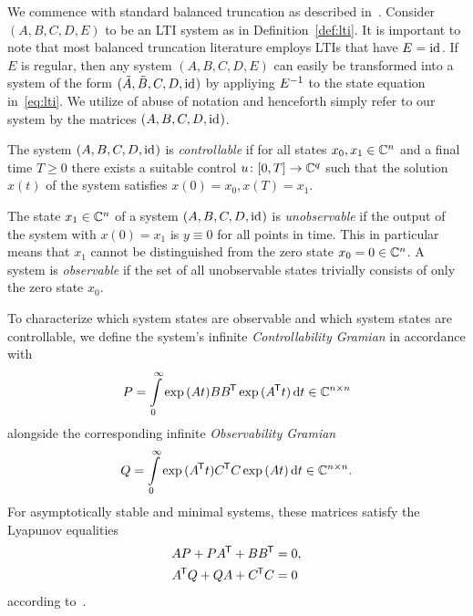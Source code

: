 We commence with standard balanced truncation as described in~\cite{BB2017}.
Consider $(A, B, C, D, E)$ to be an LTI system as in Definition~\ref{def:lti}.
It is important to note that most balanced truncation literature employs LTIs that have $E = \text{id}_{}$.
If $E$ is regular, then any system $(A, B, C, D, E)$ can easily be transformed into a system of the form $(\tilde{A}, \tilde{B}, C, D, \text{id}_{})$ by appliying $E^{-1}$ to the state equation in~\eqref{eq:lti}.
We utilize of abuse of notation and henceforth simply refer to our system by the matrices $(A, B, C, D, \text{id}_{})$.

\begin{definition}[{Cf.~\cite[Definition~6.2]{BB2017}}]\label{def:controllability}
    The system $(A, B, C, D, \text{id}_{})$ is \emph{controllable} if for all states $x_0, x_1 \in \mathbb{C}^n$ and a final time $T \geq 0$ there exists a suitable control $u \colon \interval{0}{T} \to \bb{C}^q$ such that the solution $x(t)$ of the system satisfies $x(0) = x_0, x(T) = x_1$.
\end{definition}

\begin{definition}[{Cf.~\cite[Definition~6.3]{BB2017}}]\label{def:observability}
    The state $x_1 \in \mathbb{C}^n$ of a system $(A, B, C, D, \text{id}_{})$ is \emph{unobservable} if the output of the system with $x(0) = x_1$ is $y \equiv 0$ for all points in time.
    This in particular means that $x_1$ cannot be distinguished from the zero state $x_0 = 0 \in \mathbb{C}^n$.
    A system is \emph{observable} if the set of all unobservable states trivially consists of only the zero state $x_0$.
\end{definition}

To characterize which system states are observable and which system states are controllable, we define the system's infinite \emph{Controllability Gramian} in accordance with~\cite[Equation~6.8]{BB2017}
\begin{equation}\label{eq:controllability-gramian}
    P = \int\limits_0^\infty \exp{(A t)} B B^{\mkern-1.5mu \mathsf{T}} \exp{(A^{\mkern-1.5mu \mathsf{T}}t)} \mathop{}\!\mathrm{d} t \in \mathbb{C}^{n \times n}
\end{equation}
alongside the corresponding infinite \emph{Observability Gramian}
\begin{equation}\label{eq:observability-gramian}
    Q = \int\limits_0^\infty \exp{(A^{\mkern-1.5mu \mathsf{T}}t)} C^{\mkern-1.5mu \mathsf{T}} C \exp{(A t)} \mathop{}\!\mathrm{d} t \in \mathbb{C}^{n \times n}.
\end{equation}
For asymptotically stable and minimal systems, these matrices satisfy the Lyapunov equalities
\begin{equation}\label{eq:lyapunov-equations}
    \begin{aligned}
        A P + P A^{\mkern-1.5mu \mathsf{T}} + B B^{\mkern-1.5mu \mathsf{T}} &= 0, \\
        A^{\mkern-1.5mu \mathsf{T}} Q + Q A + C^{\mkern-1.5mu \mathsf{T}} C &= 0
    \end{aligned}
\end{equation}
according to~\cite{Antoulas2005, Hinrichsen2005}.

